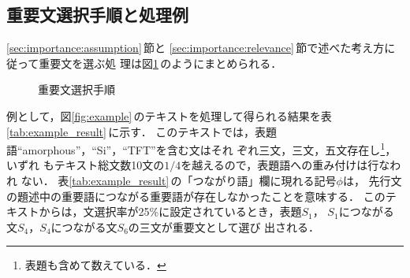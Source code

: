 \subsection{重要文選択手順と処理例}
\label{sec:importance:algorithm}

\ref{sec:importance:assumption}\,節と
\ref{sec:importance:relevance}\,節で述べた考え方に従って重要文を選ぶ処
理は図\ref{fig:algorithm}\,のようにまとめられる．
\begin{figure}[htbp]
\samepage
\begin{center}
\end{center}
\caption{重要文選択手順}
\label{fig:algorithm}
\end{figure}
例として，図\ref{fig:example}\,のテキストを処理して得られる結果を表
\ref{tab:example_result}\,に示す．
このテキストでは，表題語``amorphous''，``Si''，``TFT''を含む文はそれ
ぞれ三文，三文，五文存在し\footnote{表題も含めて数えている．}，いずれ
もテキスト総文数10文の$1/4$を越えるので，表題語への重み付けは行なわれ
ない．
表\ref{tab:example_result}\,の「つながり語」欄に現れる記号$\phi$は，
先行文の題述中の重要語につながる重要語が存在しなかったことを意味する．
このテキストからは，文選択率が25\%に設定されているとき，表題$S_1$，
$S_1$につながる文$S_4$，$S_4$につながる文$S_6$の三文が重要文として選び
出される．
